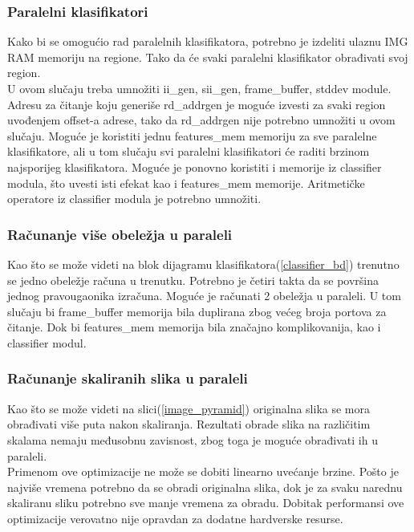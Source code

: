 \subsubsection{Paralelni klasifikatori}

Kako bi se omogućio rad paralelnih klasifikatora, potrebno je izdeliti ulaznu
IMG RAM memoriju na regione.
Tako da će svaki paralelni klasifikator obrađivati svoj region. \\

U ovom slučaju treba umnožiti ii\_gen, sii\_gen, frame\_buffer, stddev module.
Adresu za čitanje koju generiše rd\_addrgen je moguće izvesti za svaki region
uvođenjem offset-a adrese, tako da rd\_addrgen nije potrebno umnožiti u ovom
slučaju.
Moguće je koristiti jednu features\_mem memoriju za sve paralelne klasifikatore,
ali u tom slučaju svi paralelni klasifikatori će raditi brzinom najsporijeg
klasifikatora.
Moguće je ponovno koristiti i memorije iz classifier modula, što uvesti isti
efekat kao i features\_mem memorije.
Aritmetičke operatore iz classifier modula je potrebno umnožiti.

\subsubsection{Računanje više obeležja u paraleli}
Kao što se može videti na blok dijagramu klasifikatora(\ref{classifier_bd})
trenutno se jedno obeležje računa u trenutku.
Potrebno je četiri takta da se površina jednog pravougaonika izračuna.
Moguće je računati 2 obeležja u paraleli.
U tom slučaju bi frame\_buffer memorija bila duplirana zbog većeg broja portova
za čitanje.
Dok bi features\_mem memorija bila značajno komplikovanija, kao i classifier modul.

\subsubsection{Računanje skaliranih slika u paraleli}

Kao što se može videti na slici(\ref{image_pyramid}) originalna slika se mora
obrađivati više puta nakon skaliranja.
Rezultati obrade slika na različitim skalama nemaju međusobnu zavisnost, zbog
toga je moguće obrađivati ih u paraleli. \\

Primenom ove optimizacije ne može se dobiti linearno uvećanje brzine.
Pošto je najviše vremena potrebno da se obradi originalna slika, dok je za svaku
narednu skaliranu sliku potrebno sve manje vremena za obradu.
Dobitak performansi ove optimizacije verovatno nije opravdan za dodatne
hardverske resurse.
